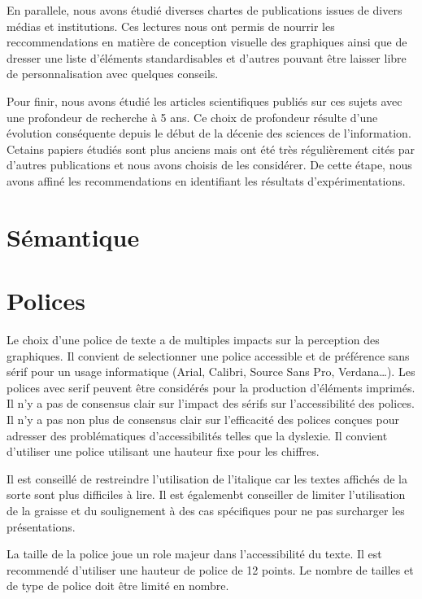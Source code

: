 \documentclass[a4paper,12pt]{article}
\begin{document}
\begin{multicols}{2}
En parallele, nous avons étudié diverses chartes de publications issues de divers médias et institutions. Ces lectures nous ont permis de nourrir les reccommendations en matière de conception visuelle des graphiques ainsi que de dresser une liste d'éléments standardisables et d'autres pouvant être laisser libre de personnalisation avec quelques conseils.

Pour finir, nous avons étudié les articles scientifiques publiés sur ces sujets avec une profondeur de recherche à 5 ans. Ce choix de profondeur résulte d'une évolution conséquente depuis le début de la décenie des sciences de l'information. Cetains papiers étudiés sont plus anciens mais ont été très régulièrement cités par d'autres publications et nous avons choisis de les considérer. De cette étape, nous avons affiné les recommendations en identifiant les résultats d'expérimentations.
\section*{Sémantique}
\label{sec:orga1f8201}
\section*{Polices}
\label{sec:org9c0a5e6}
Le choix d'une police de texte a de multiples impacts sur la perception des graphiques. Il convient de selectionner une police accessible et de préférence sans sérif pour un usage informatique (Arial, Calibri, Source Sans Pro, Verdana\ldots{}). \autocite{andreaskrauseBestPracticesData2024} Les polices avec serif peuvent être considérés pour la production d'éléments imprimés. Il n'y a pas de consensus clair sur l'impact des sérifs sur l'accessibilité des polices. \autocite{stephenfewTableDesign2012} Il n'y a pas non plus de consensus clair sur l'efficacité des polices conçues pour adresser des problématiques d'accessibilités telles que la dyslexie. Il convient d'utiliser une police utilisant une hauteur fixe pour les chiffres. \autocite{stephenfewTableDesign2012}

Il est conseillé de restreindre l'utilisation de l'italique car les textes affichés de la sorte sont plus difficiles à lire. Il est égalemenbt conseiller de limiter l'utilisation de la graisse et du soulignement à des cas spécifiques pour ne pas surcharger les présentations.

La taille de la police joue un role majeur dans l'accessibilité du texte. Il est recommendé d'utiliser une hauteur de police de 12 points.\autocite{andreaskrauseBestPracticesData2024} Le nombre de tailles et de type de police doit être limité en nombre.\autocite{andreaskrauseBestPracticesData2024}


\end{multicols}
\end{document}
